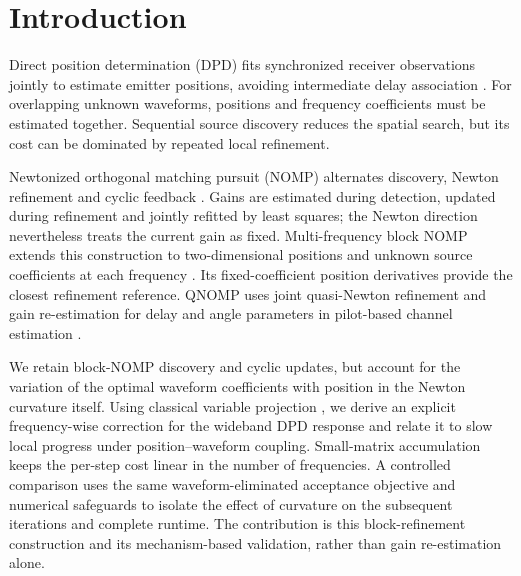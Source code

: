 \documentclass[a4paper,12pt,review]{cas-sc}
\begin{document}
\section{Introduction}
Direct position determination (DPD) fits synchronized receiver observations jointly to estimate emitter positions, avoiding intermediate delay association \cite{ChenHudsonYao2002,WeissAmar2005}. For overlapping unknown waveforms, positions and frequency coefficients must be estimated together. Sequential source discovery reduces the spatial search, but its cost can be dominated by repeated local refinement.

Newtonized orthogonal matching pursuit (NOMP) alternates discovery, Newton refinement and cyclic feedback \cite{Mamandipoor2016}. Gains are estimated during detection, updated during refinement and jointly refitted by least squares; the Newton direction nevertheless treats the current gain as fixed. Multi-frequency block NOMP extends this construction to two-dimensional positions and unknown source coefficients at each frequency \cite{Yang2022}. Its fixed-coefficient position derivatives provide the closest refinement reference. QNOMP uses joint quasi-Newton refinement and gain re-estimation for delay and angle parameters in pilot-based channel estimation \cite{Zeng2025}.

We retain block-NOMP discovery and cyclic updates, but account for the variation of the optimal waveform coefficients with position in the Newton curvature itself. Using classical variable projection \cite{GolubPereyra1973}, we derive an explicit frequency-wise correction for the wideband DPD response and relate it to slow local progress under position--waveform coupling. Small-matrix accumulation keeps the per-step cost linear in the number of frequencies. A controlled comparison uses the same waveform-eliminated acceptance objective and numerical safeguards to isolate the effect of curvature on the subsequent iterations and complete runtime. The contribution is this block-refinement construction and its mechanism-based validation, rather than gain re-estimation alone.
\end{document}
